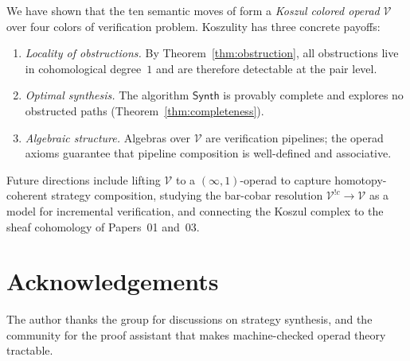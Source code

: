 \documentclass[11pt]{article}
\newcommand{\Vop}{\mathcal{V}}           %
\newcommand{\synthAlg}{\mathsf{Synth}}  %
\begin{document}
We have shown that the ten semantic moves of \JuGeo{} form a
\emph{Koszul colored operad} $\Vop$ over four colors of verification
problem.  Koszulity has three concrete payoffs:
\begin{enumerate}[nosep]
\item \emph{Locality of obstructions.}  By
  Theorem~\ref{thm:obstruction}, all obstructions live in cohomological
  degree~$1$ and are therefore detectable at the pair level.
\item \emph{Optimal synthesis.}  The algorithm $\synthAlg$ is provably
  complete and explores no obstructed paths
  (Theorem~\ref{thm:completeness}).
\item \emph{Algebraic structure.}  Algebras over $\Vop$ are verification
  pipelines; the operad axioms guarantee that pipeline composition is
  well-defined and associative.
\end{enumerate}

Future directions include lifting $\Vop$ to a $(\infty,1)$-operad to
capture homotopy-coherent strategy composition, studying the bar-cobar
resolution $\Vop^{!c} \to \Vop$ as a model for incremental
verification, and connecting the Koszul complex to the sheaf cohomology
of Papers~01 and~03.

\section*{Acknowledgements}

The author thanks the \JuGeo{} group for discussions on strategy
synthesis, and the \LEAN{} community for the proof assistant that makes
machine-checked operad theory tractable.
\end{document}
